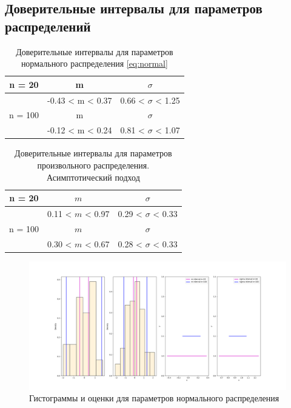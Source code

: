 \documentclass[12pt,a4paper]{article}
\begin{document}
	\newpage

	\subsection{Доверительные интервалы для параметров распределений}

	\begin{table}[htbp!]
		\centering
		\begin{tabular}{ |c|c|c| }
			\hline
			n = 20 & m & $\sigma$ \\
			\hline
			& -0.43 < m < 0.37 & 0.66 < $\sigma$ < 1.25 \\
			\hline
			n = 100 & m & $\sigma$ \\
			\hline
			& -0.12 < m < 0.24 & 0.81 < $\sigma$ < 1.07 \\
			\hline
		\end{tabular}
		\caption{Доверительные интервалы для параметров нормального распределения \eqref{eq:normal}}
		\label{table:1}
	\end{table}

	\begin{table}[htbp!]
		\centering
		\begin{tabular}{ |c|c|c| }
			\hline
			n = 20 & $m$ & $\sigma$ \\
			\hline
			& 0.11 < $m$ < 0.97 & 0.29 < $\sigma$ < 0.33 \\
			\hline
			n = 100 & $m$ & $\sigma$ \\
			\hline
			& 0.30 < $m$ < 0.67 & 0.28 < $\sigma$ < 0.33 \\
			\hline
		\end{tabular}
		\caption{Доверительные интервалы для параметров произвольного распределения. Асимптотический подход}
		\label{table:2}
	\end{table}

	\begin{figure}[htbp!]
		\begin{center}
			\includegraphics[width = 1.12\linewidth]{graphics/lab2_hists.png}
			\caption{Гистограммы и оценки для параметров нормального распределения}
		\end{center}
	\end{figure}
\end{document}
